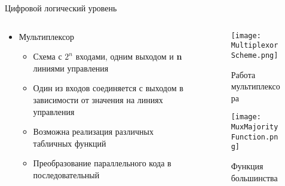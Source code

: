 \documentclass[aspectratio=169,14pt]{beamer}
\begin{document}
\begin{frame}{Цифровой логический уровень}
    \begin{columns}[T,onlytextwidth]
        \begin{column}{0.6\textwidth}
            \begin{itemize}
            \item Мультиплексор
                \begin{itemize}
                    \item Схема с $2^n$ входами, одним выходом и \textbf{n} линиями управления
                    \item Один из входов соединяется с выходом в зависимости от значения на линиях управления
                    \item Возможна реализация различных табличных функций
                    \item Преобразование параллельного кода в последовательный
                \end{itemize}
            \end{itemize}
        \end{column}
        \begin{column}{0.4\textwidth}
            \begin{figure}[htp]
                \centering
                \texttt{[image: MultiplexorScheme.png]}
                \captionsetup{skip=-5pt}
                \caption{\tiny{Работа мультиплексора}}
            \end{figure}
            \begin{figure}
                \centering
                \texttt{[image: MuxMajorityFunction.png]}
                \captionsetup{skip=-5pt}
                \caption{\tiny{Функция большинства}}
            \end{figure}
        \end{column}
    \end{columns}
\end{frame}
\end{document}
